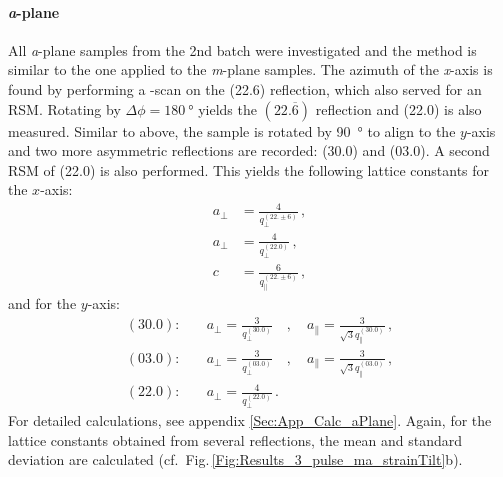 \paragraph{\textit{a}-plane}
    All \textit{a}-plane samples from the 2nd batch were investigated and the method is similar to the one applied to the \textit{m}-plane samples.
    The azimuth of the \textit{x}-axis is found by performing a \textphi-scan on the (22.6) reflection, which also served for an \gls{RSM}.
    Rotating by $\Delta\phi=\qty{180}{\degree}$ yields the $(22.\overline{6})$ reflection and (22.0) is also measured.
    Similar to above, the sample is rotated by \qty{90}{\degree} to align to the $y$-axis and two more asymmetric reflections are recorded: (30.0) and (03.0).
    A second \gls{RSM} of (22.0) is also performed.
    This yields the following lattice constants for the $x$-axis:
    \begin{align}
        a_\perp &= \frac{4}{q_\perp^{(22.\pm6)}} \,,\\
        a_\perp &= \frac{4}{q_\perp^{(22.0)}}\,,\\
        c &= \frac{6}{q_\parallel^{(22.\pm6)}} \,,
    \end{align}
    and for the $y$-axis:
    \begin{align}
        (30.0):&\quad
            a_\perp = \frac{3}{q_\perp^{(30.0)}}
            \quad,\quad
            a_\parallel = \frac{3}{\sqrt{3}q_\parallel^{(30.0)}}\,,\\
        (03.0):&\quad
            a_\perp = \frac{3}{q_\perp^{(03.0)}}
            \quad,\quad
            a_\parallel = \frac{3}{\sqrt{3}q_\parallel^{(03.0)}}\,,\\
        (22.0):&\quad
            a_\perp = \frac{4}{q_\perp^{(22.0)}}\,.
    \end{align}
    For detailed calculations, see appendix \ref{Sec:App_Calc_aPlane}.
    Again, for the lattice constants obtained from several reflections, the mean and standard deviation are calculated (cf.\ Fig.\,\ref{Fig:Results_3_pulse_ma_strainTilt}b).
